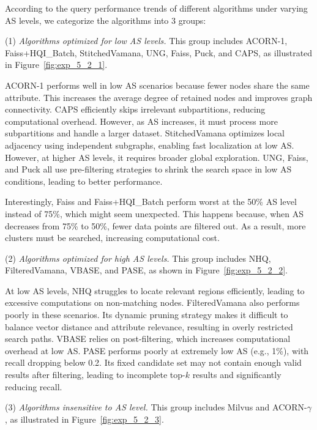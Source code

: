 \documentclass[sigconf, nonacm]{acmart}
\begin{document}
	
	According to the query performance trends of different algorithms under varying AS levels, we categorize the algorithms into 3 groups:
	
	(1) \textit{Algorithms optimized for low AS levels.}  
	This group includes ACORN-1, Faiss+HQI\_Batch, StitchedVamana, UNG, Faiss, Puck, and CAPS, as illustrated in Figure~\ref{fig:exp_5_2_1}.
	
	ACORN-1 performs well in low AS scenarios because fewer nodes share the same attribute. This increases the average degree of retained nodes and improves graph connectivity. CAPS efficiently skips irrelevant subpartitions, reducing computational overhead. However, as AS increases, it must process more subpartitions and handle a larger dataset. StitchedVamana optimizes local adjacency using independent subgraphs, enabling fast localization at low AS. However, at higher AS levels, it requires broader global exploration. UNG, Faiss, and Puck all use pre-filtering strategies to shrink the search space in low AS conditions, leading to better performance.
	
	Interestingly, Faiss and Faiss+HQI\_Batch perform worst at the 50\% AS level instead of 75\%, which might seem unexpected. This happens because, when AS decreases from 75\% to 50\%, fewer data points are filtered out. As a result, more clusters must be searched, increasing computational cost.
	
	\par
	(2) \textit{Algorithms optimized for high AS levels.}  
	This group includes NHQ, FilteredVamana, VBASE, and PASE, as shown in Figure~\ref{fig:exp_5_2_2}.
	
	At low AS levels, NHQ struggles to locate relevant regions efficiently, leading to excessive computations on non-matching nodes. FilteredVamana also performs poorly in these scenarios. Its dynamic pruning strategy makes it difficult to balance vector distance and attribute relevance, resulting in overly restricted search paths.
	VBASE relies on post-filtering, which increases computational overhead at low AS. PASE performs poorly at extremely low AS (e.g., 1\%), with recall dropping below 0.2. Its fixed candidate set may not contain enough valid results after filtering, leading to incomplete top-$k$ results and significantly reducing recall.
	
	\par
	(3) \textit{Algorithms insensitive to AS level.}  
	This group includes Milvus and ACORN-\(\gamma\), as illustrated in Figure~\ref{fig:exp_5_2_3}.
	
\end{document}
